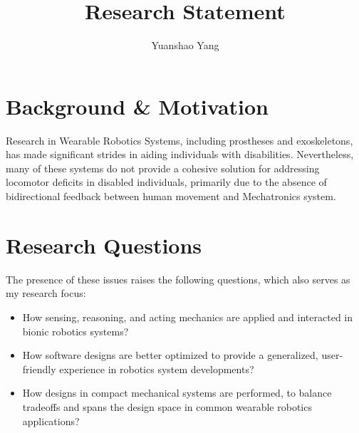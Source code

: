 \documentclass[8pt]{article}
\title{Research Statement}
\author{Yuanshao Yang}
\date{}
\begin{document}
\maketitle


\section{Background \& Motivation}


Research in Wearable Robotics Systems, including prostheses and exoskeletons, has made significant strides in aiding individuals with disabilities. Nevertheless, many of these systems do not provide a cohesive solution for addressing locomotor deficits in disabled individuals, primarily due to the absence of bidirectional feedback between human movement and Mechatronics system.


\section{Research Questions}


The presence of these issues raises the following questions, which also serves as my research focus: 

\begin{itemize}
            
    
    \item {How sensing, reasoning, and acting mechanics are applied and interacted in bionic robotics systems?}
    \item {How software designs are better optimized to provide a generalized, user-friendly experience in robotics system developments?}
    \item {How designs in compact mechanical systems are performed, to balance tradeoffs and spans the design space in common wearable robotics applications?}
    
\end{itemize}
\end{document}
